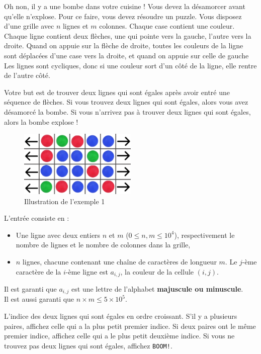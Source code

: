 \problemname{\problemyamlname}


Oh non, il y a une bombe dans votre cuisine ! Vous devez la désamorcer avant qu'elle n'explose. Pour ce faire, vous devez résoudre un puzzle.
Vous disposez d'une grille avec $n$ lignes et $m$ colonnes. Chaque case contient une couleur. Chaque ligne contient deux flèches, une qui pointe vers la gauche, l'autre vers la droite.
Quand on appuie sur la flèche de droite, toutes les couleurs de la ligne sont déplacées d'une case vers la droite, et quand on appuie sur celle de gauche
Les lignes sont cycliques, donc si une couleur sort d'un côté de la ligne, elle rentre de l'autre côté.

Votre but est de trouver deux lignes qui sont égales après avoir entré une séquence de flèches. Si vous trouvez deux lignes qui sont égales, alors vous avez désamorcé la bombe. Si vous n'arrivez pas à trouver deux lignes qui sont égales, alors la bombe explose !

\begin{figure}[H]
    \centering
    \includegraphics[width=0.5\textwidth]{illustration.png}
    \caption{Illustration de l'exemple 1}
\end{figure}

\begin{Input}
    L'entrée consiste en :
    \begin{itemize}
        \item Une ligne avec deux entiers $n$ et $m$ ($0\leq n,m \leq 10^4$), respectivement le nombre de lignes et le nombre de colonnes dans la grille,
        \item $n$ lignes, chacune contenant une chaîne de caractères de longueur $m$. Le $j$-ème caractère de la $i$-ème ligne est $a_{i,j}$, la couleur de la cellule $(i,j)$.
    \end{itemize}
    Il est garanti que $a_{i,j}$ est une lettre de l'alphabet \textbf{majuscule ou minuscule}.\\
    Il est aussi garanti que $n \times m \leq 5 \times 10^5$.
\end{Input}

\begin{Output}
    L'indice des deux lignes qui sont égales en ordre croissant. S'il y a plusieurs paires, affichez celle qui a la plus petit premier indice. Si deux paires ont le même premier indice, affichez celle qui a le plus petit deuxième indice. Si vous ne trouvez pas deux lignes qui sont égales, affichez \texttt{BOOM!}.
\end{Output}
